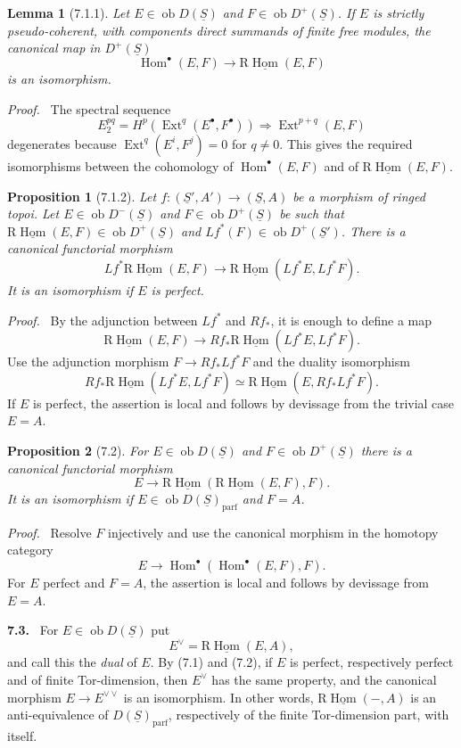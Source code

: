 \documentclass[13pt]{extarticle}
\newcommand{\uS}{\underline S}
\newcommand{\ob}{\operatorname{ob}}
\newcommand{\Hom}{\operatorname{Hom}}
\newcommand{\Ext}{\operatorname{Ext}}
\newcommand{\RHom}{\mathrm R\underline{\operatorname{Hom}}}
\newenvironment{statement}[1]{\par\medskip\noindent\textbf{#1.}\ }{\par\medskip}
\newenvironment{prooftext}[1][Proof]{\par\noindent\emph{#1.}\ }{\par\medskip}
\newtheorem*{lemma*}{Lemma}
\newtheorem*{proposition*}{Proposition}
\begin{document}
\begin{lemma*}[7.1.1]
Let $E\in\ob D(\uS)$ and $F\in\ob D^+(\uS)$. If $E$ is strictly pseudo-coherent, with components direct summands of finite free modules, the canonical map in $D^+(\uS)$
\[
\Hom^\bullet(E,F)\longrightarrow\RHom(E,F)
\]
is an isomorphism.
\end{lemma*}

\begin{prooftext}
The spectral sequence
\[
E_2^{pq}=H^p(\Ext^q(E^\bullet,F^\bullet))\Rightarrow \Ext^{p+q}(E,F)
\]
degenerates because $\Ext^q(E^i,F^j)=0$ for $q\ne0$. This gives the required isomorphisms between the cohomology of $\Hom^\bullet(E,F)$ and of $\RHom(E,F)$.
\end{prooftext}

\begin{proposition*}[7.1.2]
Let $f:(\uS',A')\to(\uS,A)$ be a morphism of ringed topoi. Let $E\in\ob D^-(\uS)$ and $F\in\ob D^+(\uS)$ be such that $\RHom(E,F)\in\ob D^+(\uS)$ and $Lf^*(F)\in\ob D^+(\uS')$. There is a canonical functorial morphism
\[
Lf^*\RHom(E,F)
\longrightarrow
\RHom(Lf^*E,Lf^*F).
\]
It is an isomorphism if $E$ is perfect.
\end{proposition*}

\begin{prooftext}
By the adjunction between $Lf^*$ and $Rf_*$, it is enough to define a map
\[
\RHom(E,F)\longrightarrow Rf_*\RHom(Lf^*E,Lf^*F).
\]
Use the adjunction morphism $F\to Rf_*Lf^*F$ and the duality isomorphism
\[
Rf_*\RHom(Lf^*E,Lf^*F)
\simeq
\RHom(E,Rf_*Lf^*F).
\]
If $E$ is perfect, the assertion is local and follows by devissage from the trivial case $E=A$.
\end{prooftext}

\begin{proposition*}[7.2]
For $E\in\ob D(\uS)$ and $F\in\ob D^+(\uS)$ there is a canonical functorial morphism
\[
E\longrightarrow\RHom(\RHom(E,F),F).
\]
It is an isomorphism if $E\in\ob D(\uS)_{\mathrm{parf}}$ and $F=A$.
\end{proposition*}

\begin{prooftext}
Resolve $F$ injectively and use the canonical morphism in the homotopy category
\[
E\longrightarrow\Hom^\bullet(\Hom^\bullet(E,F),F).
\]
For $E$ perfect and $F=A$, the assertion is local and follows by devissage from $E=A$.
\end{prooftext}

\begin{statement}{7.3}
For $E\in\ob D(\uS)$ put
\[
E^\vee=\RHom(E,A),
\]
and call this the \emph{dual} of $E$. By (7.1) and (7.2), if $E$ is perfect, respectively perfect and of finite Tor-dimension, then $E^\vee$ has the same property, and the canonical morphism $E\to E^{\vee\vee}$ is an isomorphism. In other words, $\RHom(-,A)$ is an anti-equivalence of $D(\uS)_{\mathrm{parf}}$, respectively of the finite Tor-dimension part, with itself.
\end{statement}
\end{document}

